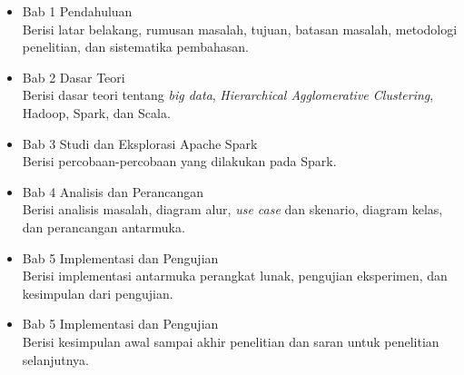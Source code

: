 \begin{itemize}

\item Bab 1 Pendahuluan\\
Berisi latar belakang, rumusan masalah, tujuan, batasan masalah, metodologi penelitian, dan
sistematika pembahasan.

\item Bab 2 Dasar Teori\\
Berisi dasar teori tentang \textit{big data}, \textit{Hierarchical Agglomerative Clustering}, Hadoop, Spark, dan Scala.

\item Bab 3 Studi dan Eksplorasi Apache Spark\\
Berisi percobaan-percobaan yang dilakukan pada Spark.

\item Bab 4 Analisis dan Perancangan\\
Berisi analisis masalah, diagram alur, \textit{use case} dan skenario, diagram kelas, dan perancangan antarmuka.

\item Bab 5 Implementasi dan Pengujian\\
Berisi implementasi antarmuka perangkat lunak, pengujian eksperimen, dan kesimpulan dari pengujian.

\item Bab 5 Implementasi dan Pengujian\\
Berisi kesimpulan awal sampai akhir penelitian dan saran untuk penelitian selanjutnya.


\end{itemize}


